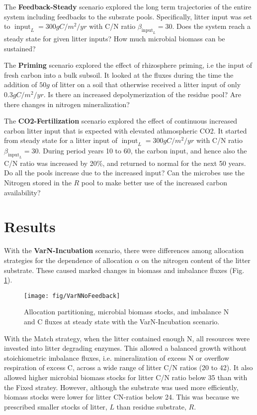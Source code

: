 The \textbf{Feedback-Steady} scenario explored the long term trajectories of
the entire system including feedbacks to the subsrate pools. Specifically, litter
input was set to $\operatorname{input}_L = 300 gC/m^2/yr$ with C/N ratio
$\beta_{\operatorname{input}_L} = 30$. Does the system reach a steady state for
given litter inputs? How much microbial biomass can be sustained?

The \textbf{Priming} scenario explored the effect of rhizosphere priming, i.e
the input of fresh carbon into a bulk subsoil. It looked at the fluxes during
the time the addition of $50 g$ of litter on a soil that otherwise
received a litter input of only $0.3 gC/m^2/yr$. Is there an increased
depolymerization of the residue pool? Are there changes in nitrogen
mineralization?

The \textbf{CO2-Fertilization} scenario explored the effect of continuous
increased carbon litter input that is expected with elevated athmospheric CO2.
It started from steady state for a litter input of $\operatorname{input}_L = 300
gC/m^2/yr$ with C/N ratio $\beta_{\operatorname{input}_L} = 30$. During period
years 10 to 60, the carbon input, and hence also the C/N ratio was increased by
20\%, and returned to normal for the next 50 years. Do all the pools increase
due to the increased input? Can the microbes use the Nitrogen stored in the $R$
pool to make better use of the increased carbon availability?

\section{Results}

With the \textbf{VarN-Incubation} scenario, there were differences among
allocation strategies for the dependence of allocation $\alpha$ on the nitrogen
content of the litter substrate. These caused marked changes in
biomass and imbalance fluxes (Fig.
\ref{fig:VarNNoFeedback}).

\begin{figure}[t]
\vspace*{2mm}
\begin{center}
\texttt{[image: fig/VarNNoFeedback]}
\end{center}
\caption{Allocation partitioning,
microbial biomass stocks, and imbalance N and C
fluxes at steady state with the VarN-Incubation scenario.
\label{fig:VarNNoFeedback}}
\end{figure}

With the Match strategy, when the litter contained enough N, all resources were
invested into litter degrading enzymes. This allowed a balanced growth without
stoichiometric imbalance fluxes, i.e. mineralization of excess N or overflow
respiration of excess C, across a wide range of litter C/N
ratios (20 to 42).
It also allowed higher microbial biomass stocks for litter C/N ratio below
35 than with the Fixed stratey. However, although the
substrate was used more efficiently, biomass stocks were lower for litter
CN-ratios below 24. This was because we prescribed smaller stocks of litter,
$L$ than residue substrate, $R$.

